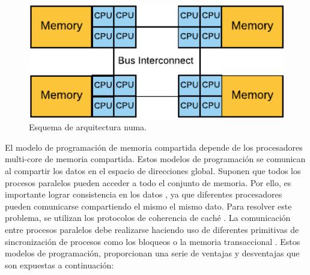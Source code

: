 \begin{itemize}
\vspace{0.35cm}
\begin{figure}[h]
 	\centering
 	\includegraphics[width=11.5cm]{figures/NUMA}
 	\caption{Esquema de arquitectura \acrshort{numa}.}
 	\label{fig:chap2:NUMA}
\end{figure} 
\vspace{0.35cm}
    
\end{itemize}

El modelo de programación de memoria compartida depende de los procesadores multi-core de memoria compartida. Estos modelos de programación se comunican al compartir los datos en el espacio de direcciones global. Suponen que todos los procesos paralelos pueden acceder a todo el conjunto de memoria. Por ello, es importante lograr consistencia en los datos \cite{gharachorloo1990memory}, ya que diferentes procesadores pueden comunicarse compartiendo el mismo el mismo dato. Para resolver este problema, se utilizan los protocolos de coherencia de caché \cite{cacheprotocol}. La comunicación entre procesos paralelos debe realizarse haciendo uso de diferentes primitivas de sincronización de procesos como los bloqueos o la memoria transaccional \cite{hammond2004transactional}. Estos modelos de programación, proporcionan una serie de ventajas y desventajas que son expuestas a continuación:

